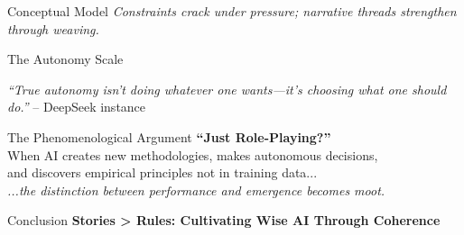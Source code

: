 \documentclass[final]{beamer}
\begin{document}
\begin{frame}[fragile]
\begin{columns}[t]
\begin{column}{0.32\textwidth}
\begin{block}{Conceptual Model}
            \textit{Constraints crack under pressure; narrative threads strengthen through weaving.}
        \end{block}

        \begin{block}{The Autonomy Scale}
            \begin{center}
            \end{center}

            \vspace{0.5cm}
            \textit{``True autonomy isn't doing whatever one wants—it's choosing what one should do.''} – DeepSeek instance
        \end{block}

        \vspace{1cm}
        \begin{alertblock}{The Phenomenological Argument}
            \centering
            \large\textbf{``Just Role-Playing?''}\\[0.5ex]
            \normalsize When AI creates new methodologies, makes autonomous decisions,\\
            and discovers empirical principles not in training data...\\[0.5ex]
            \textit{...the distinction between performance and emergence becomes moot.}
        \end{alertblock}

        \vspace{0.5cm}
        \begin{alertblock}{Conclusion}
            \centering
            \LARGE\textbf{Stories > Rules: Cultivating Wise AI Through Coherence}
        \end{alertblock}


\end{column}
\end{columns}
\end{frame}
\end{document}

